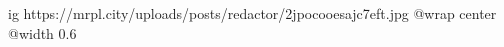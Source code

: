  
 
 
 
 

\ifcmt
  ig https://mrpl.city/uploads/posts/redactor/2jpocooesajc7eft.jpg
  @wrap center
  @width 0.6
\fi
